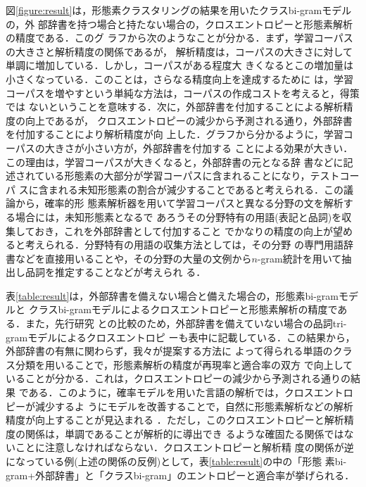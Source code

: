 図\ref{figure:result}は，形態素クラスタリングの結果を用いたクラスbi-gramモデルの，外
部辞書を持つ場合と持たない場合の，クロスエントロピーと形態素解析の精度である．このグ
ラフから次のようなことが分かる．まず，学習コーパスの大きさと解析精度の関係であるが，
解析精度は，コーパスの大きさに対して単調に増加している．しかし，コーパスがある程度大
きくなるとこの増加量は小さくなっている．このことは，さらなる精度向上を達成するために
は，学習コーパスを増やすという単純な方法は，コーパスの作成コストを考えると，得策では
ないということを意味する．次に，外部辞書を付加することによる解析精度の向上であるが，
クロスエントロピーの減少から予測される通り，外部辞書を付加することにより解析精度が向
上した．グラフから分かるように，学習コーパスの大きさが小さい方が，外部辞書を付加する
ことによる効果が大きい．この理由は，学習コーパスが大きくなると，外部辞書の元となる辞
書などに記述されている形態素の大部分が学習コーパスに含まれることになり，テストコーパ
スに含まれる未知形態素の割合が減少することであると考えられる．この議論から，確率的形
態素解析器を用いて学習コーパスと異なる分野の文を解析する場合には，未知形態素となるで
あろうその分野特有の用語(表記と品詞)を収集しておき，これを外部辞書として付加すること
でかなりの精度の向上が望めると考えられる．分野特有の用語の収集方法としては，その分野
の専門用語辞書などを直接用いることや，その分野の大量の文例から$n$-gram統計を用いて抽
出し品詞を推定すること\cite{nグラム統計によるコーパスからの未知語抽出}などが考えられ
る．

表\ref{table:result}は，外部辞書を備えない場合と備えた場合の，形態素bi-gramモデルと
クラスbi-gramモデルによるクロスエントロピーと形態素解析の精度である．また，先行研究
との比較のため，外部辞書を備えていない場合の品詞tri-gramモデルによるクロスエントロピ
ーも表中に記載している．この結果から，外部辞書の有無に関わらず，我々が提案する方法に
よって得られる単語のクラス分類を用いることで，形態素解析の精度が再現率と適合率の双方
で向上していることが分かる．これは，クロスエントロピーの減少から予測される通りの結果
である．このように，確率モデルを用いた言語の解析では，クロスエントロピーが減少するよ
うにモデルを改善することで，自然に形態素解析などの解析精度が向上することが見込まれる
．ただし，このクロスエントロピーと解析精度の関係は，単調であることが解析的に導出でき
るような確固たる関係ではないことに注意しなければならない．クロスエントロピーと解析精
度の関係が逆になっている例(上述の関係の反例)として，表\ref{table:result}の中の「形態
素bi-gram+外部辞書」と「クラスbi-gram」のエントロピーと適合率が挙げられる．



